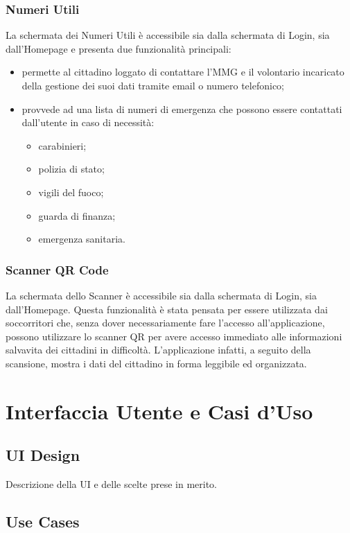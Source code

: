 \documentclass[12pt,a4paper,twoside,openright,titlepage]{book}
\begin{document}
\subsection{Numeri Utili}
La schermata dei Numeri Utili è accessibile sia dalla schermata di Login, sia dall'Homepage e presenta due funzionalità principali:
\begin{itemize}
\item permette al cittadino loggato di contattare l'MMG e il volontario incaricato della gestione dei suoi dati tramite email o numero telefonico;
\item provvede ad una lista di numeri di emergenza che possono essere contattati dall'utente in caso di necessità:
\begin{itemize}
\item carabinieri;
\item polizia di stato;
\item vigili del fuoco;
\item guarda di finanza;
\item emergenza sanitaria.
\end{itemize}
\end{itemize}

\subsection{Scanner QR Code}
La schermata dello Scanner è accessibile sia dalla schermata di Login, sia dall'Homepage. Questa funzionalità è stata pensata per essere utilizzata dai soccorritori che, senza dover necessariamente fare l'accesso all'applicazione, possono utilizzare lo scanner QR per avere accesso immediato alle informazioni salvavita dei cittadini in difficoltà. L'applicazione infatti, a seguito della scansione, mostra i dati del cittadino in forma leggibile ed organizzata.

\chapter{Interfaccia Utente e Casi d'Uso}
\section{UI Design}
Descrizione della UI e delle scelte prese in merito.

\section{Use Cases}
\end{document}
